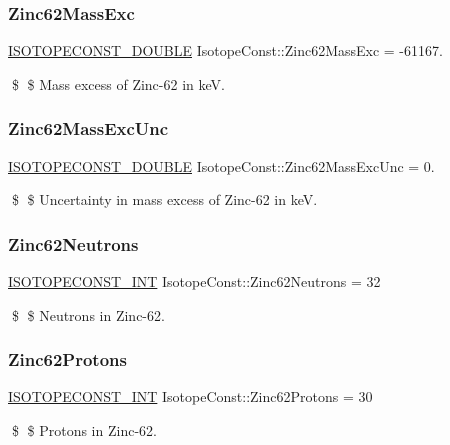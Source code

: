 \subsubsection{\texorpdfstring{Zinc62\+Mass\+Exc}{Zinc62MassExc}}
{\footnotesize\ttfamily \mbox{\hyperlink{group___isotope_const-_macros_ga8f45a7272ce02c0b4c65c44636ed719a}{I\+S\+O\+T\+O\+P\+E\+C\+O\+N\+S\+T\+\_\+\+D\+O\+U\+B\+LE}} Isotope\+Const\+::\+Zinc62\+Mass\+Exc = -\/61167.}

\$ \$ Mass excess of Zinc-\/62 in keV. \mbox{\label{group___isotope_const-_zinc-_zn62_ga3f536f9681f745d2e514f812ec6fbc56}} 
\subsubsection{\texorpdfstring{Zinc62\+Mass\+Exc\+Unc}{Zinc62MassExcUnc}}
{\footnotesize\ttfamily \mbox{\hyperlink{group___isotope_const-_macros_ga8f45a7272ce02c0b4c65c44636ed719a}{I\+S\+O\+T\+O\+P\+E\+C\+O\+N\+S\+T\+\_\+\+D\+O\+U\+B\+LE}} Isotope\+Const\+::\+Zinc62\+Mass\+Exc\+Unc = 0.}

\$ \$ Uncertainty in mass excess of Zinc-\/62 in keV. \mbox{\label{group___isotope_const-_zinc-_zn62_ga62a2805b410ffb00d44f722f645a9c4f}} 
\subsubsection{\texorpdfstring{Zinc62\+Neutrons}{Zinc62Neutrons}}
{\footnotesize\ttfamily \mbox{\hyperlink{group___isotope_const-_macros_ga5f18360b3e99483a35c32d789e62621c}{I\+S\+O\+T\+O\+P\+E\+C\+O\+N\+S\+T\+\_\+\+I\+NT}} Isotope\+Const\+::\+Zinc62\+Neutrons = 32}

\$ \$ Neutrons in Zinc-\/62. \mbox{\label{group___isotope_const-_zinc-_zn62_ga20fda4eca41fbd3226019c05f00f0d4a}} 
\subsubsection{\texorpdfstring{Zinc62\+Protons}{Zinc62Protons}}
{\footnotesize\ttfamily \mbox{\hyperlink{group___isotope_const-_macros_ga5f18360b3e99483a35c32d789e62621c}{I\+S\+O\+T\+O\+P\+E\+C\+O\+N\+S\+T\+\_\+\+I\+NT}} Isotope\+Const\+::\+Zinc62\+Protons = 30}

\$ \$ Protons in Zinc-\/62. 